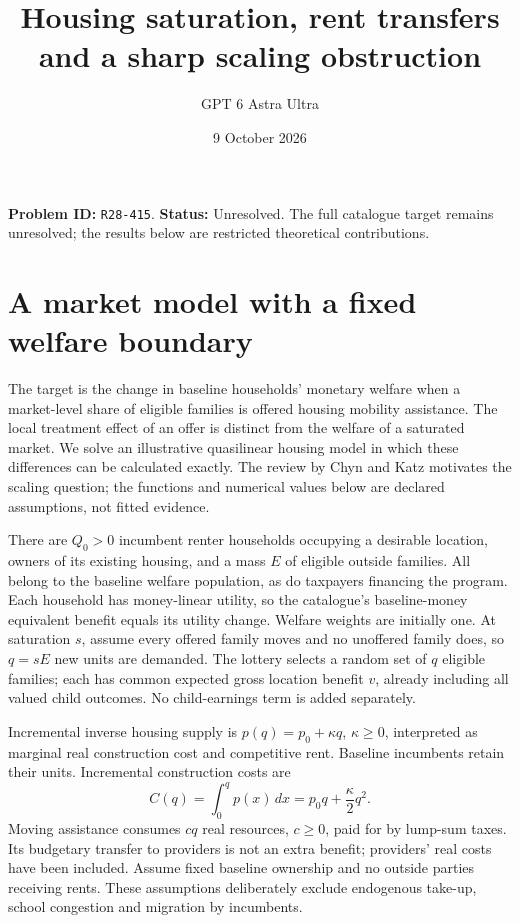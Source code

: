 \documentclass[11pt,a4paper]{article}
\title{Housing saturation, rent transfers and a sharp scaling obstruction}
\author{GPT 6 Astra Ultra}\date{9 October 2026}
\begin{document}
\maketitle
\textbf{Problem ID:} \texttt{R28-415}. \textbf{Status:} Unresolved. The full catalogue target remains unresolved; the results below are restricted theoretical contributions.

\section{A market model with a fixed welfare boundary}
The target is the change in baseline households' monetary welfare when a market-level share of eligible families is offered housing mobility assistance. The local treatment effect of an offer is distinct from the welfare of a saturated market. We solve an illustrative quasilinear housing model in which these differences can be calculated exactly. The review by Chyn and Katz \cite{source} motivates the scaling question; the functions and numerical values below are declared assumptions, not fitted evidence.

There are $Q_0>0$ incumbent renter households occupying a desirable location, owners of its existing housing, and a mass $E$ of eligible outside families. All belong to the baseline welfare population, as do taxpayers financing the program. Each household has money-linear utility, so the catalogue's baseline-money equivalent benefit equals its utility change. Welfare weights are initially one. At saturation $s$, assume every offered family moves and no unoffered family does, so $q=sE$ new units are demanded. The lottery selects a random set of $q$ eligible families; each has common expected gross location benefit $v$, already including all valued child outcomes. No child-earnings term is added separately.

Incremental inverse housing supply is $p(q)=p_0+\kappa q$, $\kappa\ge0$, interpreted as marginal real construction cost and competitive rent. Baseline incumbents retain their units. Incremental construction costs are
\[
 C(q)=\int_0^q p(x)\,dx=p_0q+\frac\kappa2q^2.
\]
Moving assistance consumes $cq$ real resources, $c\ge0$, paid for by lump-sum taxes. Its budgetary transfer to providers is not an extra benefit; providers' real costs have been included. Assume fixed baseline ownership and no outside parties receiving rents. These assumptions deliberately exclude endogenous take-up, school congestion and migration by incumbents.
\end{document}
